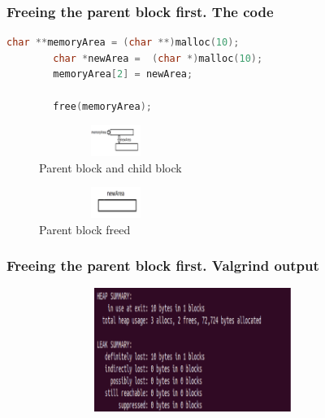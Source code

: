 \documentclass{bredelebeamer}
\begin{document}
\begin{frame}[fragile]
\frametitle{Freeing the parent block first. The code} 
	\begin{center}
		\begin{lstlisting}[language=C++]
		char **memoryArea = (char **)malloc(10);
		char *newArea =  (char *)malloc(10);
		memoryArea[2] = newArea;

		free(memoryArea);
		\end{lstlisting}

		\begin{figure}
			\caption{Parent block and child block}
			\includegraphics[height=1cm,width=5cm]{freeing-parent-block-first.png}
		\end{figure}

		\begin{figure}
			\caption{Parent block freed}
			\includegraphics[height=1cm,width=5cm]{freeing-parent-block-first2.png}
		\end{figure}
	\end{center}
\end{frame}

\begin{frame}[fragile]
	\frametitle{Freeing the parent block first. Valgrind output}
	\begin{center}
		\begin{figure}
			\includegraphics[height=4cm,width=10cm]{freeing-parent-block-first-valgrind.png}
		\end{figure}
	\end{center}
\end{frame}
\end{document}
